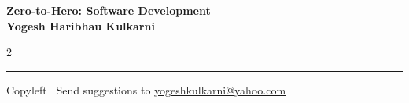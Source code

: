 \documentclass[8pt,landscape]{article}
\begin{document}
\footnotesize


\begin{center}
\Large{\textbf{Zero-to-Hero: Software Development\\ Yogesh Haribhau Kulkarni}}
\end{center}

\begin{multicols}{2}

\end{multicols}

\rule{\linewidth}{0.25pt}
\scriptsize
Copyleft \textcopyleft\  Send suggestions to
\href{http://www.yogeshkulkarni.com}{yogeshkulkarni@yahoo.com}
\end{document}
